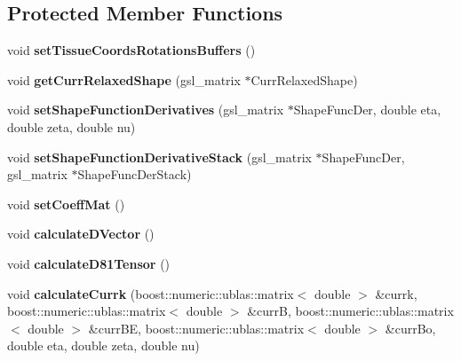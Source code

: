 \subsection*{Protected Member Functions}
\begin{DoxyCompactItemize}
\item 
\hypertarget{classPrism_a39d403ac6ffb6b56d5b2d07f8e9463a4}{}void {\bfseries set\+Tissue\+Coords\+Rotations\+Buffers} ()\label{classPrism_a39d403ac6ffb6b56d5b2d07f8e9463a4}

\item 
\hypertarget{classPrism_a3c252dc104a1ca7208b23c72737cd916}{}void {\bfseries get\+Curr\+Relaxed\+Shape} (gsl\+\_\+matrix $\ast$Curr\+Relaxed\+Shape)\label{classPrism_a3c252dc104a1ca7208b23c72737cd916}

\item 
\hypertarget{classPrism_aa1a4d3411d1f3dc05816ec01dcfa8310}{}void {\bfseries set\+Shape\+Function\+Derivatives} (gsl\+\_\+matrix $\ast$Shape\+Func\+Der, double eta, double zeta, double nu)\label{classPrism_aa1a4d3411d1f3dc05816ec01dcfa8310}

\item 
\hypertarget{classPrism_aa1f76f3cabdd00eb057f41cebbaa466d}{}void {\bfseries set\+Shape\+Function\+Derivative\+Stack} (gsl\+\_\+matrix $\ast$Shape\+Func\+Der, gsl\+\_\+matrix $\ast$Shape\+Func\+Der\+Stack)\label{classPrism_aa1f76f3cabdd00eb057f41cebbaa466d}

\item 
\hypertarget{classPrism_a0575442613f8b7d9428c58cef19ab219}{}void {\bfseries set\+Coeff\+Mat} ()\label{classPrism_a0575442613f8b7d9428c58cef19ab219}

\item 
\hypertarget{classPrism_a1bf622277c72a0ee0372c0a30a15ae6d}{}void {\bfseries calculate\+D\+Vector} ()\label{classPrism_a1bf622277c72a0ee0372c0a30a15ae6d}

\item 
\hypertarget{classPrism_ad339c17c6a056074dc4e642de9492c57}{}void {\bfseries calculate\+D81\+Tensor} ()\label{classPrism_ad339c17c6a056074dc4e642de9492c57}

\item 
\hypertarget{classPrism_aa433244f86cdf23a611a1adc3391c3f0}{}void {\bfseries calculate\+Currk} (boost\+::numeric\+::ublas\+::matrix$<$ double $>$ \&currk, boost\+::numeric\+::ublas\+::matrix$<$ double $>$ \&curr\+B, boost\+::numeric\+::ublas\+::matrix$<$ double $>$ \&curr\+B\+E, boost\+::numeric\+::ublas\+::matrix$<$ double $>$ \&curr\+Bo, double eta, double zeta, double nu)\label{classPrism_aa433244f86cdf23a611a1adc3391c3f0}


\end{DoxyCompactItemize}
